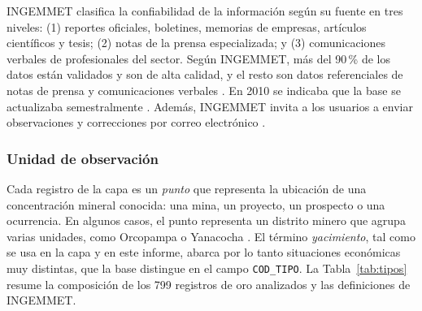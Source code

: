 \documentclass[man,12pt,a4paper,floatsintext,donotrepeattitle]{apa7}
\begin{document}
INGEMMET clasifica la confiabilidad de la información según su fuente en tres
niveles: (1) reportes oficiales, boletines, memorias de empresas, artículos
científicos y tesis; (2) notas de la prensa especializada; y (3) comunicaciones
verbales de profesionales del sector. Según INGEMMET, más del 90\,\% de los
datos están validados y son de alta calidad, y el resto son datos referenciales
de notas de prensa y comunicaciones verbales \parencite{ingemmet2026servicio}. En 2010 se indicaba que la base se
actualizaba semestralmente \parencite{huanacuni2010cpg}. Además, INGEMMET invita a
los usuarios a enviar observaciones y correcciones por correo electrónico
\parencite{huanacuni2010guia}.

\subsubsection{Unidad de observación}

Cada registro de la capa es un \textit{punto} que representa la ubicación de una
concentración mineral conocida: una mina, un proyecto, un prospecto o una
ocurrencia. En algunos casos, el punto representa un distrito minero que agrupa
varias unidades, como Orcopampa o Yanacocha \parencite{ingemmet2026servicio}. El
término \textit{yacimiento}, tal como se usa en la capa y en este informe,
abarca por lo tanto situaciones económicas muy distintas, que la base distingue
en el campo \texttt{COD\_TIPO}. La Tabla~\ref{tab:tipos} resume la composición de
los 799 registros de oro analizados y las definiciones de INGEMMET.
\end{document}
